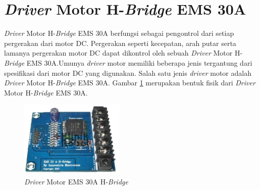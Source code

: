 \section{\textit{Driver} Motor H-\textit{Bridge} EMS 30A}
\textit{Driver} Motor H-\textit{Bridge} EMS 30A berfungsi sebagai pengontrol dari setiap pergerakan dari motor DC. Pergerakan seperti kecepatan, arah putar serta lamanya pergerakan motor DC dapat dikontrol oleh sebuah \textit{Driver} Motor H-\textit{Bridge} EMS 30A.Umunya \textit{driver} motor memiliki beberapa jenis tergantung dari spesifikasi dari motor DC yang digunakan. Salah satu jenis \textit{driver} motor adalah \textit{Driver} Motor  H-\textit{Bridge} EMS 30A. Gambar \ref{pic.drivermotor} merupakan bentuk fisik dari \textit{Driver} Motor H-\textit{Bridge} EMS 30A.

	\begin{figure}[H]
	\centering
	\includegraphics[width=5cm]{gambar/driver_motor.jpg}
	\caption{\textit{Driver} Motor EMS 30A H-\textit{Bridge}}
	\label{pic.drivermotor}
	\end{figure}

